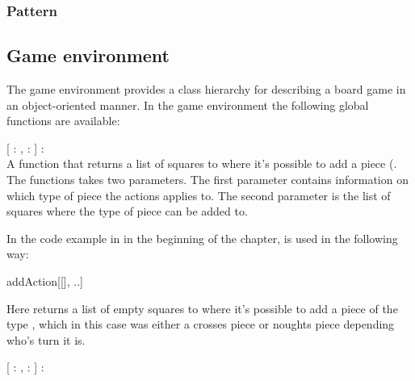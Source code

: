 \subsubsection{Pattern}

\subsection{Game environment}
\label{sec:gameenvironment}

The game environment provides a class hierarchy for describing a board game in an object-oriented manner.
In the game environment the following global functions are available:

\begin{dlist}
  \item {}[ : ,  : ] : \\
    A function that returns a list of squares  to where it's possible to add a piece (. The functions
    takes two parameters. The first parameter contains information on which type of piece the actions applies to. The second parameter is
    the list of squares where the type of piece can be added to.
    
    In the code example in  in the beginning of the chapter,  is used in the following
    way: \\
    \begin{center}
    {addAction}[[], ..]
    \end{center}
    
    Here  returns a list of empty squares to where it's possible to add a piece of the type , which in this case was
    either a crosses piece or noughts piece depending who's turn it is.
  \item {}[ : ,  : ] : \\
  	
    
\end{dlist}



